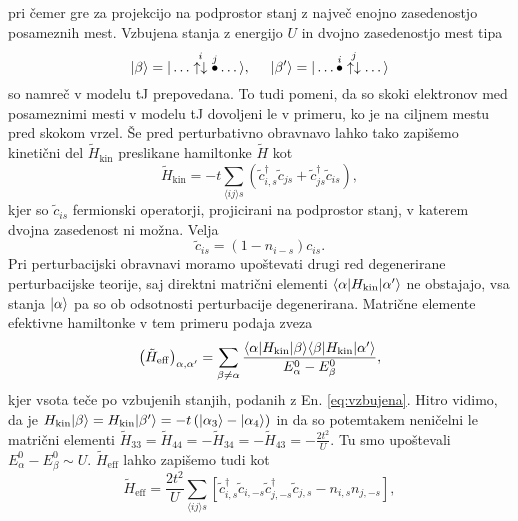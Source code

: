 \documentclass[10pt,a4paper]{article}
\begin{document}
pri čemer gre za projekcijo na podprostor stanj z največ enojno zasedenostjo posameznih mest.  Vzbujena stanja z energijo $U$ in dvojno zasedenostjo mest tipa 
\begin{equation}\label{eq:vzbujena}
\vert\beta\rangle=\vert\dots \overset{i}{\uparrow\downarrow}\overset{j}{\bullet}\dots\rangle, \hspace{5mm} 
\vert\beta'\rangle=\vert\dots \overset{i}{\bullet}\overset{j}{\uparrow\downarrow}\dots\rangle
\end{equation}
 so namreč v modelu tJ prepovedana. To tudi pomeni, da so skoki elektronov med posameznimi mesti v modelu tJ dovoljeni le v primeru, ko je na ciljnem mestu pred skokom vrzel. Še pred perturbativno obravnavo lahko tako zapišemo kinetični del $\tilde{H}_\mathrm{kin}$ preslikane hamiltonke $\tilde{H}$ kot 
$$
\tilde{H}_\mathrm{kin}=-t\sum\limits_{\langle ij \rangle s} \left(\tilde{c}^\dagger_{i,s} \tilde{c}_{js} + \tilde{c}^\dagger_{js}\tilde{c}_{is}\right),
$$
kjer so $\tilde{c}_{is}$ fermionski operatorji, projicirani na podprostor stanj, v katerem dvojna zasedenost ni možna. Velja 
\begin{equation}
\tilde{c}_{is}=\left(1-n_{i-s}\right) c_{is}.
\end{equation}
Pri perturbacijski obravnavi moramo upoštevati drugi red degenerirane perturbacijske teorije, saj direktni matrični elementi $\langle \alpha \vert H_\mathrm{kin} \vert\alpha'\rangle$ ne obstajajo, vsa stanja $\vert\alpha\rangle$ pa so ob odsotnosti perturbacije degenerirana. 
Matrične elemente efektivne hamiltonke v tem primeru podaja zveza 
\begin{equation}
\left(\tilde{H}_\mathrm{eff}\right)_{\alpha, \alpha'}=\sum\limits_{\beta\neq\alpha}\frac{\langle \alpha \vert H_\mathrm{kin}\vert\beta\rangle\langle \beta \vert H_\mathrm{kin}\vert\alpha'\rangle}{E_\alpha^0 - E_\beta^0},
\end{equation}
kjer vsota teče po vzbujenih stanjih, podanih z En. \eqref{eq:vzbujena}. Hitro vidimo, da je 
$H_\mathrm{kin}\vert\beta\rangle=H_\mathrm{kin}\vert\beta'\rangle=-t\left(\vert\alpha_3\rangle- \vert\alpha_4\rangle\right)$ in da so potemtakem neničelni le matrični elementi $\tilde{H}_{33}=\tilde{H}_{44}=-\tilde{H}_{34}=-\tilde{H}_{43}=-\frac{2t^2}{U}$. Tu smo upoštevali $E_\alpha^0- E_\beta^0 \sim U$. $\tilde{H}_\mathrm{eff}$ lahko zapišemo tudi kot 
\begin{equation}\label{eq:efektivno}
\tilde{H}_\mathrm{eff} = \frac{2t^2}{U}\sum\limits_{\langle ij\rangle s } \left[\tilde{c}^\dagger_{i,s}\tilde{c}_{i,-s}\tilde{c}^\dagger_{j,-s}\tilde{c}_{j,s} - n_{i,s}n_{j,-s}  \right], 
\end{equation}
\end{document}
